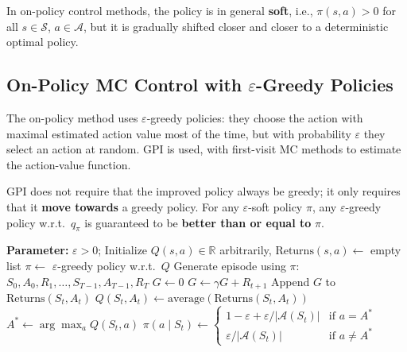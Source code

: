 \documentclass[11pt,a4paper]{article}
\theoremstyle{definition}
\theoremstyle{plain}
\theoremstyle{remark}
\begin{document}
In on-policy control methods, the policy is in general \textbf{soft}, i.e., $\pi(s, a) > 0$ for all $s \in \mathcal{S}$, $a \in \mathcal{A}$, but it is gradually shifted closer and closer to a deterministic optimal policy.

\subsection{On-Policy MC Control with $\varepsilon$-Greedy Policies}

The on-policy method uses $\varepsilon$-greedy policies: they choose the action with maximal estimated action value most of the time, but with probability $\varepsilon$ they select an action at random. GPI is used, with first-visit MC methods to estimate the action-value function.

GPI does not require that the improved policy always be greedy; it only requires that it \textbf{move towards} a greedy policy. For any $\varepsilon$-soft policy $\pi$, any $\varepsilon$-greedy policy w.r.t.\ $q_\pi$ is guaranteed to be \textbf{better than or equal to} $\pi$.

\begin{algorithm}
\caption{On-Policy First-Visit MC Control (for $\varepsilon$-soft policies), estimating $\pi \approx \pi_*$}
\begin{algorithmic}
\STATE \textbf{Parameter:} $\varepsilon > 0$; Initialize $Q(s, a) \in \mathbb{R}$ arbitrarily, $\text{Returns}(s,a) \leftarrow$ empty list
\STATE $\pi \leftarrow$ $\varepsilon$-greedy policy w.r.t.\ $Q$
\LOOP
    \STATE Generate episode using $\pi$: $S_0, A_0, R_1, \ldots, S_{T-1}, A_{T-1}, R_T$
    \STATE $G \leftarrow 0$
        \STATE $G \leftarrow \gamma G + R_{t+1}$
            \STATE Append $G$ to $\text{Returns}(S_t, A_t)$
            \STATE $Q(S_t, A_t) \leftarrow \text{average}(\text{Returns}(S_t, A_t))$
            \STATE $A^* \leftarrow \arg\max_a Q(S_t, a)$
                \STATE $\pi(a \mid S_t) \leftarrow \begin{cases}
                    1 - \varepsilon + \varepsilon/|\mathcal{A}(S_t)| & \text{if } a = A^* \\
                    \varepsilon / |\mathcal{A}(S_t)| & \text{if } a \neq A^*
                \end{cases}$
            \ENDFOR
        \ENDIF
    \ENDFOR
\ENDLOOP
\end{algorithmic}
\end{algorithm}
\end{document}
